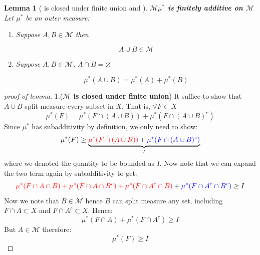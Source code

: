 \documentclass[a4paper,11pt,oneside]{book}
\newtheorem{lemma}[theorem]{Lemma}
\begin{document}
\begin{lemma}[ is closed under finite union and ]\textbf{$\mathcal M$$\mu^{*}$ is finitely additive on $\mathcal M$}\\
Let $\mu^{*}$ be an outer measure:

\begin{enumerate}
\item Suppose $A,B\in \mathcal M$ then

\begin{equation}
A\cup B\in \mathcal M
\end{equation}


\item Suppose $A,B\in \mathcal M$, $A\cap B=\varnothing$

\begin{equation}
\mu^{*}(A \cup B) = \mu^*(A)+\mu^*(B)
\end{equation}
\end{enumerate}

\end{lemma}\begin{proof}[proof of lemma]1.(\textbf{$\mathcal M$ is closed under finite union}) It suffice to show that $A \cup B$ split measure every subset in $X$. That is, $\forall F\subset X$
\begin{equation}
\mu^*(F)=\mu^*(F\cap(A\cup B)) + \mu^*(F\cap(A\cup B)^c)
\end{equation}
Since $\mu^*$ has subadditivity by definition, we only need to show:
\begin{equation}
\mu^*(F)\geq \underbrace{\textcolor{red}{\mu^*(F\cap(A\cup B))} + \textcolor{blue}{\mu^*(F\cap(A\cup B)^c)}}_{I}
\end{equation}
where we denoted the quantity to be bounded as $I$. Now note that we can expand the two term again by subadditivity to get:
\begin{equation}
\textcolor{red}{\mu^*(F\cap A \cap B) + \mu^*(F\cap A \cap B^c)+\mu^*(F\cap A^c \cap B)} + \textcolor{blue}{\mu^*(F\cap A^c \cap B^c)}\geq I
\end{equation}
Now we note that $B\in \mathcal M$ hence $B$ can split measure any set, including $F\cap A\subset X$ and $F\cap A^c \subset X$. Hence:
\begin{equation}
\mu^*(F\cap A) +\mu^*(F \cap A^c)\geq I
\end{equation}
But $A \in \mathcal M$ therefore:
\begin{equation}
\mu^*(F)\geq I
\end{equation}


\end{proof}
\end{document}
